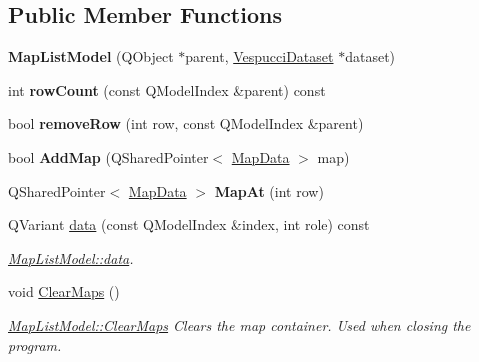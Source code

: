 \subsection*{Public Member Functions}
\begin{DoxyCompactItemize}
\item 
{\bfseries Map\+List\+Model} (Q\+Object $\ast$parent, \hyperlink{class_vespucci_dataset}{Vespucci\+Dataset} $\ast$dataset)\hypertarget{class_map_list_model_a8efdb956b03e7d40872a247f0f0031c5}{}\label{class_map_list_model_a8efdb956b03e7d40872a247f0f0031c5}

\item 
int {\bfseries row\+Count} (const Q\+Model\+Index \&parent) const \hypertarget{class_map_list_model_a109d6521ba8f2e40f07edd09e3e6fdcc}{}\label{class_map_list_model_a109d6521ba8f2e40f07edd09e3e6fdcc}

\item 
bool {\bfseries remove\+Row} (int row, const Q\+Model\+Index \&parent)\hypertarget{class_map_list_model_a67bc521b5f6aa669b4b62b1119573629}{}\label{class_map_list_model_a67bc521b5f6aa669b4b62b1119573629}

\item 
bool {\bfseries Add\+Map} (Q\+Shared\+Pointer$<$ \hyperlink{class_map_data}{Map\+Data} $>$ map)\hypertarget{class_map_list_model_a44517a4200ce59ff5cfbf6a644c66005}{}\label{class_map_list_model_a44517a4200ce59ff5cfbf6a644c66005}

\item 
Q\+Shared\+Pointer$<$ \hyperlink{class_map_data}{Map\+Data} $>$ {\bfseries Map\+At} (int row)\hypertarget{class_map_list_model_a8620132016e5ae59ea1a60f08167a8d6}{}\label{class_map_list_model_a8620132016e5ae59ea1a60f08167a8d6}

\item 
Q\+Variant \hyperlink{class_map_list_model_a5052c6bc02674c253d497fa5c5a455d5}{data} (const Q\+Model\+Index \&index, int role) const 
\begin{DoxyCompactList}\small\item\em \hyperlink{class_map_list_model_a5052c6bc02674c253d497fa5c5a455d5}{Map\+List\+Model\+::data}. \end{DoxyCompactList}\item 
void \hyperlink{class_map_list_model_a1acfd761a0d1efc2226f177f6b0dc039}{Clear\+Maps} ()\hypertarget{class_map_list_model_a1acfd761a0d1efc2226f177f6b0dc039}{}\label{class_map_list_model_a1acfd761a0d1efc2226f177f6b0dc039}

\begin{DoxyCompactList}\small\item\em \hyperlink{class_map_list_model_a1acfd761a0d1efc2226f177f6b0dc039}{Map\+List\+Model\+::\+Clear\+Maps} Clears the map container. Used when closing the program. \end{DoxyCompactList}\end{DoxyCompactItemize}


